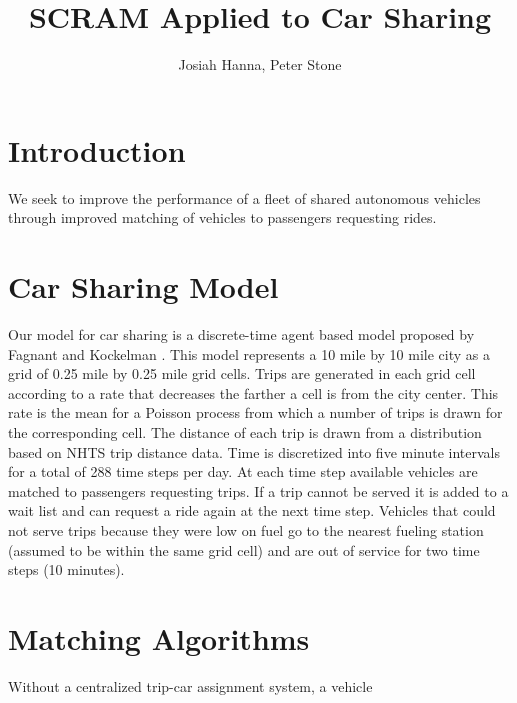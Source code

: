 \documentclass[letterpaper]{article}
\begin{document}
%
\title{SCRAM Applied to Car Sharing}
\author{Josiah Hanna, Peter Stone}
\maketitle
\begin{abstract}
\begin{quote}

\end{quote}
\end{abstract}

\noindent 

\section{Introduction}
We seek to improve the performance of a fleet of shared autonomous vehicles through improved matching of vehicles to passengers requesting rides. 

\section{Car Sharing Model}
Our model for car sharing is a discrete-time agent based model proposed by Fagnant and Kockelman \cite{fagnant2014travel}. This model represents a 10 mile by 10 mile city as a grid of 0.25 mile by 0.25 mile grid cells. 
Trips are generated in each grid cell according to a rate that decreases the farther a cell is from the city center. This rate is the mean for a Poisson process from which a number of trips is drawn for the corresponding cell. The distance of each trip is drawn from a distribution based on NHTS trip distance data. 
Time is discretized into five minute intervals for a total of 288 time steps per day. At each time step available vehicles are matched to passengers requesting trips. If a trip cannot be served it is added to a wait list and can request a ride again at the next time step. Vehicles that could not serve trips because they were low on fuel go to the nearest fueling station (assumed to be within the same grid cell) and are out of service for two time steps (10 minutes). 

\section{Matching Algorithms}
Without a centralized trip-car assignment system, a vehicle 




\end{document}
